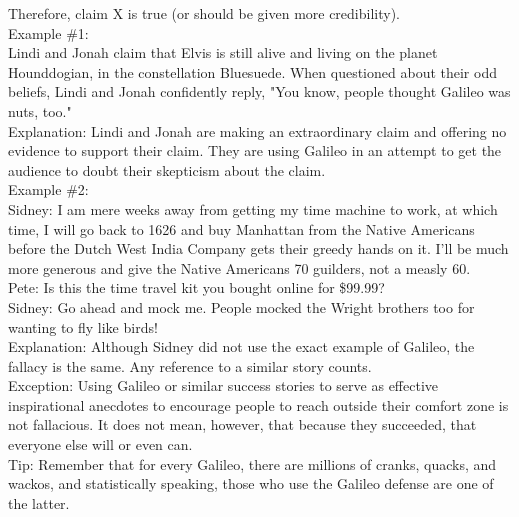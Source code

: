 \documentclass[a4paper,12pt,single,pdftex]{scrbook}
\begin{document}
    
      Therefore, claim X is true (or should be given more credibility).
    \\

    
      Example \#1:
    \\

    
      Lindi and Jonah claim that Elvis is still alive and living on the planet Hounddogian, in the constellation Bluesuede. When questioned about their odd beliefs, Lindi and Jonah confidently reply, "You know, people thought Galileo was nuts, too."
    \\

    
      Explanation: Lindi and Jonah are making an extraordinary claim and offering no evidence to support their claim. They are using Galileo in an attempt to get the audience to doubt their skepticism about the claim.
    \\

    
      Example \#2:
    \\

    
      Sidney: I am mere weeks away from getting my time machine to work, at which time, I will go back to 1626 and buy Manhattan from the Native Americans before the Dutch West India Company gets their greedy hands on it. I'll be much more generous and give the Native Americans 70 guilders, not a measly 60.
    \\

    
      Pete: Is this the time travel kit you bought online for \$99.99?
    \\

    
      Sidney: Go ahead and mock me. People mocked the Wright brothers too for wanting to fly like birds!
    \\

    
      Explanation: Although Sidney did not use the exact example of Galileo, the fallacy is the same. Any reference to a similar story counts.
    \\

    
      Exception: Using Galileo or similar success stories to serve as effective inspirational anecdotes to encourage people to reach outside their comfort zone is not fallacious. It does not mean, however, that because they succeeded, that everyone else will or even can.
    \\

    
      Tip: Remember that for every Galileo, there are millions of cranks, quacks, and wackos, and statistically speaking, those who use the Galileo defense are one of the latter.
    \\
\end{document}
